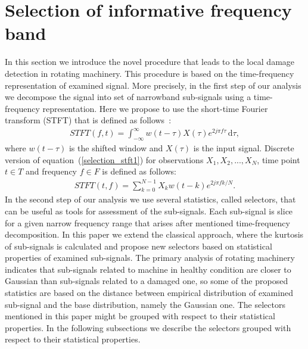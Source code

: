 \section{Selection of informative frequency band}\label{methodology_selection}

In this section we introduce the novel procedure that leads to the local damage detection in rotating machinery. This procedure is based on the time-frequency representation of examined signal. More precisely, in the first step of our analysis we decompose the signal into set of narrowband sub-signals using a time-frequency representation. Here we propose to use the short-time Fourier transform (STFT) that  is defined as follows~\cite{Allen1977235}:
\begin{eqnarray}\label{selection_stft1}
STFT(f,t)=\int_{-\infty}^{\infty}{w(t-\tau)X(\tau)e^{2j\pi f\tau}}\, \mathrm{d} \tau,
\label{selection_stft-cont}\end{eqnarray}
where $w(t-\tau)$ is the shifted window and $X(\tau)$ is the input signal. Discrete version of equation~(\ref{selection_stft1}) for observations $X_1,X_2,...,X_N$, time point $t\in T$ and frequency $f\in \textit{F} $ is defined as follows:
\begin{eqnarray}
STFT(t,f)=\sum_{k=0}^{N-1}X_k w(t-k)e^{2j\pi f k/N}.
\label{selection_stft-discr}\end{eqnarray}
In the second step of our analysis we use several statistics, called selectors, that can be useful as tools for assessment of the sub-signals. Each sub-signal is slice for a given narrow frequency range that arises after mentioned time-frequency decomposition. In this paper we extend the classical approach, where the kurtosis of sub-signals is calculated and propose new selectors based on statistical properties of examined sub-signals. The primary analysis of rotating machinery indicates that sub-signals related to machine in healthy condition are closer to Gaussian than sub-signals related to a damaged one, so some of the proposed statistics are based on the distance between empirical distribution of examined sub-signal and the base distribution, namely the Gaussian one. The selectors mentioned in this paper might be grouped with respect to their statistical properties. In the following subsections we describe the selectors grouped with respect to their statistical properties.
